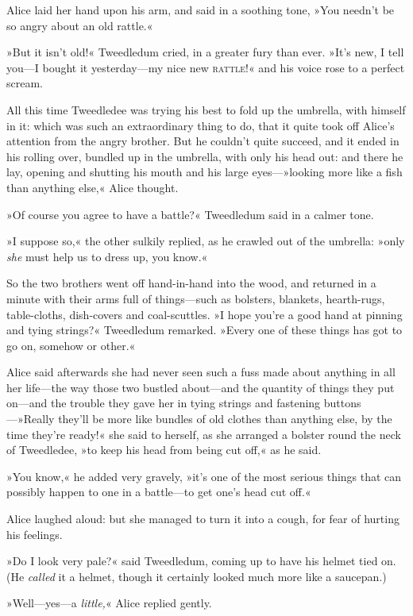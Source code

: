 Alice laid her hand upon his arm, and said in a soothing tone, »You needn't be so angry about an old rattle.«

»But it isn't old!« Tweedledum cried, in a greater fury than ever. »It's new, I tell you—I bought it yesterday—my nice new \textsc{rattle}!« and his voice rose to a perfect scream.

All this time Tweedledee was trying his best to fold up the umbrella, with himself in it: which was such an extraordinary thing to do, that it quite took off Alice's attention from the angry brother. But he couldn't quite succeed, and it ended in his rolling over, bundled up in the umbrella, with only his head out: and there he lay, opening and shutting his mouth and his large eyes—»looking more like a fish than anything else,« Alice thought.

»Of course you agree to have a battle?« Tweedledum said in a calmer tone.

»I suppose so,« the other sulkily replied, as he crawled out of the umbrella: »only \textit{she} must help us to dress up, you know.«

So the two brothers went off hand-in-hand into the wood, and returned in a minute with their arms full of things—such as bolsters, blankets, hearth-rugs, table-cloths, dish-covers and coal-scuttles. »I hope you're a good hand at pinning and tying strings?« Tweedledum remarked. »Every one of these things has got to go on, somehow or other.«

Alice said afterwards she had never seen such a fuss made about anything in all her life—the way those two bustled about—and the quantity of things they put on—and the trouble they gave her in tying strings and fastening buttons—»Really they'll be more like bundles of old clothes than anything else, by the time they're ready!« she said to herself, as she arranged a bolster round the neck of Tweedledee, »to keep his head from being cut off,« as he said.

»You know,« he added very gravely, »it's one of the most serious things that can possibly happen to one in a battle—to get one's head cut off.«

Alice laughed aloud: but she managed to turn it into a cough, for fear of hurting his feelings.

»Do I look very pale?« said Tweedledum, coming up to have his helmet tied on. (He \textit{called} it a helmet, though it certainly looked much more like a saucepan.)

»Well—yes—a \textit{little,}« Alice replied gently.

